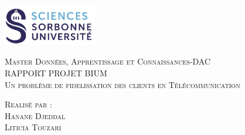 \documentclass{article}
\begin{document}
\begin{titlepage}
    \begin{flushleft}
    \includegraphics[width=11em]{logo.png}\\[1.5cm]
    \end{flushleft}
    \begin{center}
        \textsc{{\LARGE \color{blue} Master Données, Apprentissage et Connaissances-DAC}}\\[5cm]
        \textsc{\huge{RAPPORT PROJET BIUM}}\\[1cm]
        \textsc{\vspace{10pt}\Huge{Un problème de fidelissation des clients en Télécommunication}}\\[4cm]
        \begin{minipage}{1\textwidth}
            \begin{flushleft} \large
            \textsc{\LARGE{Realisé par :}}\\[0.5cm]
            \textsc{Hanane Djeddal}\\
            \textsc{Liticia Touzari}\\[1.5 cm]
            \end{flushleft}
        \end{minipage}
        \vfill
    \end{center}
  \end{titlepage}
  

\tableofcontents					%


\newpage
\end{document}
